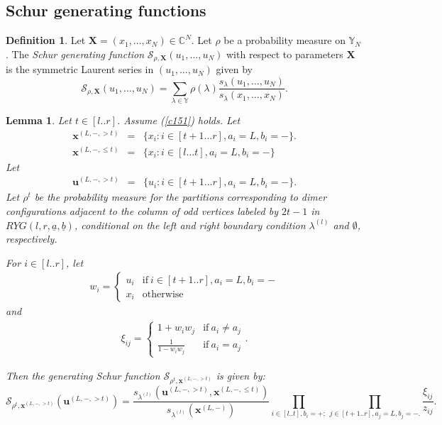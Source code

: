 \documentclass[11pt]{amsart}
\theoremstyle{plain}
\newtheorem{lemma}[theorem]{Lemma}
\theoremstyle{definition}
\newtheorem{definition}[theorem]{Definition}
\theoremstyle{remark}
\newcommand\CC{\mathbb{C}}
\newcommand\YY{\mathbb{Y}}
\numberwithin{equation}{section}
\numberwithin{theorem}{section}
\numberwithin{figure}{section}
\begin{document}
\subsection{Schur generating functions}
\begin{definition}
  \label{df21}
  Let $\mathbf{X}=(x_1,\ldots,x_N)\in\CC^{N}$. Let $\rho$ be a
  probability measure on $\YY_N$. The \emph{Schur generating function}
  $\mathcal{S}_{\rho,\mathbf{X}}(u_1,\ldots,u_N)$ with respect to parameters
  $\mathbf{X}$ is the symmetric Laurent series in $(u_1,\ldots,u_N)$ given by
  \begin{equation*}
    \mathcal{S}_{\rho,\mathbf{X}}(u_1,\ldots,u_N)=
    \sum_{\lambda\in \YY} \rho(\lambda)
    \frac{s_{\lambda}(u_1,\ldots,u_N)}{s_{\lambda}(x_1,\ldots,x_N)}.
  \end{equation*}
\end{definition}

\begin{lemma}
  \label{lm212}
  Let $t\in[l..r]$. Assume (\ref{c151}) holds. Let
\begin{eqnarray*}
\mathbf{x}^{(L,-,> t)}&=&\{x_i:i\in[t+1...r],a_i=L,b_i=-\}.\\
\mathbf{x}^{(L,-,\leq t)}&=&\{x_i:i\in[l...t],a_i=L,b_i=-\}
\end{eqnarray*}
Let
\begin{eqnarray*}
\mathbf{u}^{(L,-,> t)}&=&\{u_i:i\in[t+1...r],a_i=L,b_i=-\}.
\end{eqnarray*}
Let $\rho^t$ be the probability measure for the partitions corresponding to dimer configurations adjacent to the column of odd vertices labeled by $2t-1$ in $RYG(l,r,\underline{a},\underline{b})$, conditional on the left and right boundary condition $\lambda^{(l)}$ and $\emptyset$, respectively.

For $i\in[l..r]$, let
  \begin{eqnarray*}
  w_i=\begin{cases}u_i&\mathrm{if}\ i\in[t+1..r],a_i=L,b_i=-\\ x_i&\mathrm{otherwise}\end{cases}
  \end{eqnarray*}
  and 
  \begin{eqnarray*}
\xi_{ij}=\begin{cases}1+w_iw_j&\mathrm{if}\ a_i\neq a_j\\\frac{1}{1-w_iw_j}&\mathrm{if}\ a_i=a_j\end{cases}.
\end{eqnarray*}

  Then the generating Schur function $\mathcal{S}_{\rho^t,\mathbf{x}^{(L,-,>t)}}$ is given by:
\begin{equation}
\mathcal{S}_{\rho^t,\mathbf{x}^{(L,-,> t)}}(\mathbf{u}^{(L,-,> t)})=
\frac{s_{\lambda^{(l)}}\left(\mathbf{u}^{(L,-,> t)},\mathbf{x}^{(L,-,\leq t)}\right)}{s_{\lambda^{(l)}}(\mathbf{x}^{(L,-)})}
\prod_{i\in[l..t],b_i=+;}
\prod_{j\in[t+1..r],a_j=L,b_j=-.}\frac{\xi_{ij}}{z_{ij}}.\label{fsg}
\end{equation}
\end{lemma}
\end{document}
